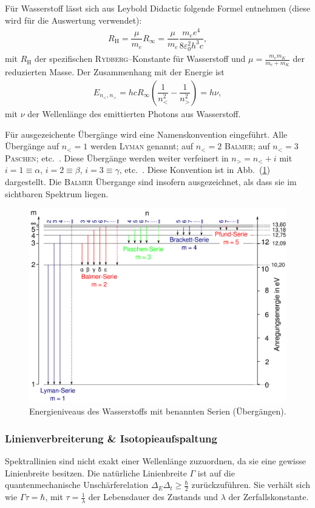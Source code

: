 \documentclass[sn-mathphys-num,iicol]{sn-jnl}
\theoremstyle{thmstyleone}
\theoremstyle{thmstyletwo}
\theoremstyle{thmstylethree}
\begin{document}
Für Wasserstoff lässt sich aus Leybold Didactic \cite{LeyboldBalmerserieBeobachtung} folgende Formel entnehmen (diese wird für die Auswertung verwendet):
\begin{align} 
        R_\text{H}=\dfrac{\mu }{m_e}R_{\infty}=\dfrac{\mu }{m_e}\dfrac{m_e e^4}{8\varepsilon _0^2h^3c}
,\end{align} 
mit $R_\text{H}$ der spezifischen \textsc{Rydberg}--Konstante für Wasserstoff und $\mu =\tfrac{m_em_K}{m_e+m_K}$ der reduzierten Masse.
Der Zusammenhang mit der Energie ist
\begin{align} 
        E_{n_<,n_>}=hcR_\infty\left(\dfrac{1}{n_<^2}-\dfrac{1}{n_>^2}\right)=h\nu 
,\end{align} 
mit $\nu $ der Wellenlänge des emittierten Photons aus Wasserstoff.

Für ausgezeichente Übergänge wird eine Namenskonvention eingeführt.
Alle Übergänge auf $n_<=1$ werden \textsc{Lyman} genannt; auf $n_<=2$ \textsc{Balmer}; auf $n_<=3$ \textsc{Paschen}; etc.\ .
Diese Übergänge werden weiter verfeinert in $n_>=n_<+i$ mit $i=1\equiv \alpha $, $i=2\equiv \beta $, $i=3\equiv \gamma $, etc.\ .
Diese Konvention ist in Abb.\ (\ref{fig:serien}) dargestellt.
Die \textsc{Balmer} Übergange sind insofern ausgezeichnet, als dass sie im sichtbaren Spektrum liegen.

\begin{figure}[t]
        \centering
        \includegraphics[width=.5\textwidth]{402_serien.png}
        \caption{Energieniveaus des Wasserstoffs mit benannten Serien (Übergängen).\cite{WikipediaSerien}} \label{fig:serien}
\end{figure}

\subsubsection{Linienverbreiterung \& Isotopieaufspaltung}
Spektrallinien sind nicht exakt einer Wellenlänge zuzuordnen, da sie eine gewisse Linienbreite besitzen.
Die natürliche Linienbreite $\Gamma $ ist auf die quantenmechanische Unschärferelation $\Delta _E\Delta _t \geq \tfrac{\hbar }{2}$ zurückzuführen.
Sie verhält sich wie $\Gamma \tau =\hbar $, mit $\tau =\tfrac{1}{\lambda }$ der Lebensdauer des Zustands und $\lambda $ der Zerfallskonstante.
\end{document}
